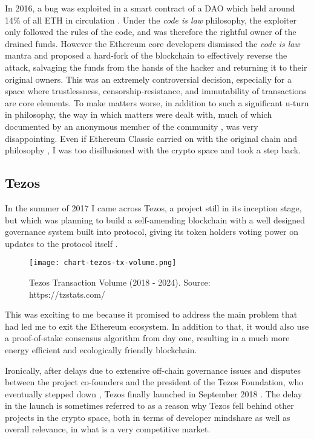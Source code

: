 In 2016, a bug was exploited in a smart contract of a DAO which held around 14\% of all ETH in circulation \cite{morrisCoinDeskTurns102023}. Under the \emph{code is law} philosophy, the exploiter only followed the rules of the code, and was therefore the rightful owner of the drained funds. However the Ethereum core developers dismissed the \emph{code is law} mantra and proposed a hard-fork of the blockchain \cite{buterinCRITICALUPDATERe2016} to effectively reverse the attack, salvaging the funds from the hands of the hacker and returning it to their original owners. This was an extremely controversial decision, especially for a space where trustlessness, censorship-resistance, and immutability of transactions are core elements. To make matters worse, in addition to such a significant u-turn in philosophy, the way in which matters were dealt with, much of which documented by an anonymous member of the community \cite{yourstruly1DAOHistoryIt2018}, was very disappointing. Even if Ethereum Classic carried on with the original chain and philosophy \cite{CodeLaw2022}, I was too disillusioned with the crypto space and took a step back.


\subsection{Tezos}

In the summer of 2017 I came across Tezos, a project still in its inception stage, but which was planning to build a self-amending blockchain with a well designed governance system built into protocol, giving its token holders voting power on updates to the protocol itself \cite{goodmanTezosSelfamendingCryptoledger2014a} . 


\begin{figure}[h]
    \centering
    \texttt{[image: chart-tezos-tx-volume.png]}
    \caption[Tezos Transaction Volume]{Tezos Transaction Volume (2018 - 2024). Source: https://tzstats.com/}
    \label{fig:tezos-tx-vol}
\end{figure}


This was exciting to me because it promised to address the main problem that had led me to exit the Ethereum ecosystem. In addition to that, it would also use a proof-of-stake consensus algorithm from day one, resulting in a much more energy efficient and ecologically friendly blockchain.


Ironically, after delays due to extensive \gls{off-chain} governance issues and disputes between the project co-founders and the president of the Tezos Foundation, who eventually stepped down \cite{irreraExclusiveTezosFounders2017}, Tezos finally launched in September 2018 \cite{daleBillionTezosBlockchain2018}. The delay in the launch is sometimes referred to as a reason why Tezos fell behind other projects in the crypto space, both in terms of developer mindshare as well as overall relevance, in what is a very competitive market.

